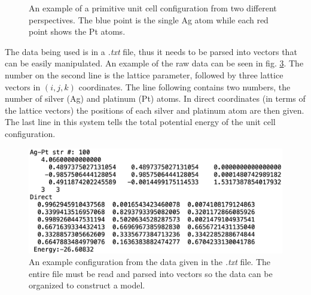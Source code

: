 \begin{figure}
\begin{subfigure}{0.49\textwidth}
    \label{primitiveSecond}
  \end{subfigure}%
\caption{An example of a primitive unit cell configuration from two different perspectives. The blue point is the single Ag atom while each red point shows the Pt atoms.
\label{primitiveUnitCells}}
\end{figure}

\par The data being used is in a \textit{.txt} file, thus it needs to be parsed into vectors that can be easily manipulated. An example of the raw data can be seen in fig. \ref{system2data}. The number on the second line is the lattice parameter, followed by three lattice vectors in $(i,j,k)$ coordinates. The line following contains two numbers, the number of silver (Ag) and platinum (Pt) atoms. In direct coordinates (in terms of the lattice vectors) the positions of each silver and platinum atom are then given. The last line in this system tells the total potential energy of the unit cell configuration. 

\begin{figure}%
\centering
\includegraphics[scale = 0.47]{Figures/system2}
\caption{An example configuration from the data given in the \textit{.txt} file. The entire file must be read and parsed into vectors so the data can be organized to construct a model.
\label{system2data}} 
\end{figure}

